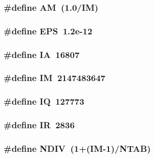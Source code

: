 \subsubsection{\setlength{\rightskip}{0pt plus 5cm}\#define AM~(1.0/IM)}\label{randme_8c_d301e6a88b1c01108f4867f2ea6f683c}


\subsubsection{\setlength{\rightskip}{0pt plus 5cm}\#define EPS~1.2e-12}\label{randme_8c_6ebf6899d6c1c8b7b9d09be872c05aae}


\subsubsection{\setlength{\rightskip}{0pt plus 5cm}\#define IA~16807}\label{randme_8c_e4b0efde4fa4613b407716d265d19b0a}


\subsubsection{\setlength{\rightskip}{0pt plus 5cm}\#define IM~2147483647}\label{randme_8c_51c0dfe766601d31e907fceae818a7ca}


\subsubsection{\setlength{\rightskip}{0pt plus 5cm}\#define IQ~127773}\label{randme_8c_b7c5f3342853af6bb48d0ca00b05efbe}


\subsubsection{\setlength{\rightskip}{0pt plus 5cm}\#define IR~2836}\label{randme_8c_68e22635ff207d8ca10459833856bd75}


\subsubsection{\setlength{\rightskip}{0pt plus 5cm}\#define NDIV~(1+(IM-1)/NTAB)}\label{randme_8c_62339d74dd5d9d00480e1a288cf88fe8}


